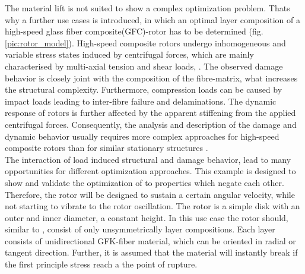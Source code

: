 The material lift is not suited to show a complex optimization problem.
Thats why a further use cases is introduced, 
in which an optimal layer composition of a 
high-speed glass fiber composite(GFC)-rotor has to be determined (fig. \ref{pic:rotor_model}).
High-speed composite rotors undergo inhomogeneous and variable stress states induced
by centrifugal forces, which are mainly characterised by multi-axial tension and shear
loads, \cite{filippatos_damage_2017}.
The observed damage behavior is closely joint with the composition of the fibre-matrix, 
what increases the structural complexity.
Furthermore, compression loads can be caused by impact loads leading to inter-fibre failure and delaminations.
The dynamic response of rotors is further affected by the apparent stiffening from
the applied centrifugal forces. 
Consequently, the analysis and description of the damage
and dynamic behavior usually requires more complex approaches for high-speed composite
rotors than for similar stationary structures \cite{filippatos_damage_2017}.\\
The interaction of load induced structural and damage behavior, lead to many opportunities for different optimization approaches. 
This example is designed to show and validate the optimization of to properties which negate each other.
Therefore, the rotor will be designed to sustain a certain angular velocity, while not starting to vibrate to the rotor oscillation.
The rotor is a simple disk with an outer and inner diameter, a constant height.
In this use case the rotor should, similar to \cite{Filippatos2021}, consist of only unsymmetrically layer compositions.
Each layer consists of unidirectional GFK-fiber material,
which can be oriented in radial or tangent direction.
Further, it is assumed that the material will instantly break if the first principle stress reach a the point of rupture.
